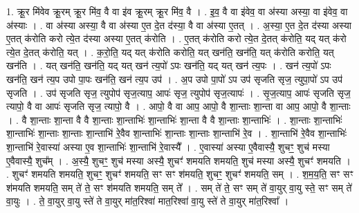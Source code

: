 \documentclass[17pt]{extarticle}
\begin{document}
1. क्रू॒र मि॑वेव क्रू॒रम् क्रू॒र मि॑व॒ वै वा इ॑व क्रू॒रम् क्रू॒र मि॑व॒ वै । . इ॒व॒ वै वा इ॑वेव॒ वा अ॑स्या अस्या॒ वा इ॑वेव॒ वा अ॑स्याः । . वा अ॑स्या अस्या॒ वै वा अ॑स्या ए॒त दे॒त द॑स्या॒ वै वा अ॑स्या ए॒तत् । . अ॒स्या॒ ए॒त दे॒त द॑स्या अस्या ए॒तत् क॑रोति करो त्ये॒त द॑स्या अस्या ए॒तत् क॑रोति । . ए॒तत् क॑रोति करो त्ये॒त दे॒तत् क॑रोति॒ यद् यत् क॑रो त्ये॒त दे॒तत् क॑रोति॒ यत् । . क॒रो॒ति॒ यद् यत् क॑रोति करोति॒ यत् खन॑ति॒ खन॑ति॒ यत् क॑रोति करोति॒ यत् खन॑ति । . यत् खन॑ति॒ खन॑ति॒ यद् यत् खन॑ त्य॒पो॑ ऽपः खन॑ति॒ यद् यत् खन॑ त्य॒पः । . खन॑ त्य॒पो॑ ऽपः खन॑ति॒ खन॑ त्य॒प उपो पा॒पः खन॑ति॒ खन॑ त्य॒प उप॑ । . अ॒प उपो पा॒पो॑ ऽप उप॑ सृजति सृज॒ त्युपा॒पो॑ ऽप उप॑ सृजति । . उप॑ सृजति सृज॒ त्युपोप॑ सृज॒त्याप॒ आपः॑ सृज॒ त्युपोप॑ सृज॒त्यापः॑ । . सृ॒ज॒त्याप॒ आपः॑ सृजति सृज॒ त्यापो॒ वै वा आपः॑ सृजति सृज॒ त्यापो॒ वै । . आपो॒ वै वा आप॒ आपो॒ वै शा॒न्ताः शा॒न्ता वा आप॒ आपो॒ वै शा॒न्ताः । . वै शा॒न्ताः शा॒न्ता वै वै शा॒न्ताः शा॒न्ताभिः॑ शा॒न्ताभिः॑ शा॒न्ता वै वै शा॒न्ताः शा॒न्ताभिः॑ । . शा॒न्ताः शा॒न्ताभिः॑ शा॒न्ताभिः॑ शा॒न्ताः शा॒न्ताः शा॒न्ताभि॑ रे॒वैव शा॒न्ताभिः॑ शा॒न्ताः शा॒न्ताः शा॒न्ताभि॑ रे॒व । . शा॒न्ताभि॑ रे॒वैव शा॒न्ताभिः॑ शा॒न्ताभि॑ रे॒वास्या॑ अस्या ए॒व शा॒न्ताभिः॑ शा॒न्ताभि॑ रे॒वास्यै᳚ । . ए॒वास्या॑ अस्या ए॒वैवास्यै॒ शुचꣳ॒॒ शुच॑ मस्या ए॒वैवास्यै॒ शुच᳚म् । . अ॒स्यै॒ शुचꣳ॒॒ शुच॑ मस्या अस्यै॒ शुचꣳ॑ शमयति शमयति॒ शुच॑ मस्या अस्यै॒ शुचꣳ॑ शमयति । . शुचꣳ॑ शमयति शमयति॒ शुचꣳ॒॒ शुचꣳ॑ शमयति॒ सꣳ सꣳ श॑मयति॒ शुचꣳ॒॒ शुचꣳ॑ शमयति॒ सम् । . श॒म॒य॒ति॒ सꣳ सꣳ श॑मयति शमयति॒ सम् ते॑ ते॒ सꣳ श॑मयति शमयति॒ सम् ते᳚ । . सम् ते॑ ते॒ सꣳ सम् ते॑ वा॒युर् वा॒यु स्ते॒ सꣳ सम् ते॑ वा॒युः । . ते॒ वा॒युर् वा॒यु स्ते॑ ते वा॒युर् मा॑त॒रिश्वा॑ मात॒रिश्वा॑ वा॒यु स्ते॑ ते वा॒युर् मा॑त॒रिश्वा᳚ । \newline
\end{document}
